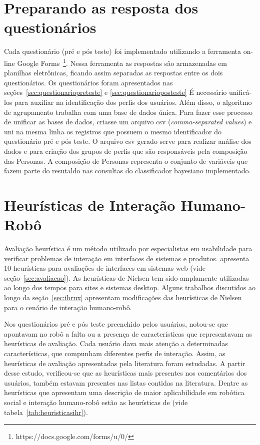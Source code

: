 \section{Preparando as resposta dos questionários}
\label{sec:respostasbd}
Cada questionário (pré e pós teste) foi implementado utilizando a ferramenta on-line Google Forms~\footnote{https://docs.google.com/forms/u/0/}. Nessa ferramenta as respostas são armazenadas em planilhas eletrônicas, ficando assim separadas as respostas entre os dois questionários. Os questionários foram apresentados nas seções~\ref{sec:questionariopreteste} e \ref{sec:questionarioposteste} É necessário unificá-los para auxiliar na identificação dos perfis dos usuários. Além disso, o algoritmo de agrupamento trabalha com uma base de dados única. Para fazer esse processo de unificar as bases de dados, criasse um arquivo csv (\emph{comma-separated values}) e uni na mesma linha os registros que possuem o mesmo identificador do questionário pré e pós teste. O arquivo csv gerado serve para realizar análise dos dados e para criação dos grupos de perfis que são responsáveis pela composição das Personas. A composição de Personas representa o conjunto de variáveis que fazem parte do resutaldo nas consultas do classificador bayesiano implementado.

\section{Heurísticas de Interação Humano-Robô}
\label{sec:heuristicas}
Avaliação heurística é um método utilizado por especialistas em usabilidade para verificar problemas de interação em interfaces de sistemas e produtos.  apresenta 10 heurísticas para avaliações de interfaces em sistemas web (vide seção~\ref{sec:avaliacao}). As heurísticas de Nielsen tem sido amplamente utilizadas ao longo dos tempos para sites e sistemas desktop. Alguns trabalhos discutidos ao longo da seção~\ref{sec:ihrux} apresentam modificações das heurísticas de Nielsen para o cenário de interação humano-robô.

Nos questionários pré e pós teste preenchido pelos usuários, notou-se que apontavam no robô a falta ou a presença de características que representavam as heurísticas de avaliação. Cada usuário dava mais atenção a determinadas características, que compunham diferentes perfis de interação. Assim, as heurísticas de avaliação apresentadas pela literatura foram estudadas. A partir desse estudo, verificou-se que as heurísticas mais presentes nos comentários dos usuários, também estavam presentes nas listas contidas na literatura. Dentre as heurísticas que apresentam uma descrição de maior aplicabilidade em robótica social e interação humano-robô estão as heurísticas de  (vide tabela~\ref{tab:heuristicasihr}).

